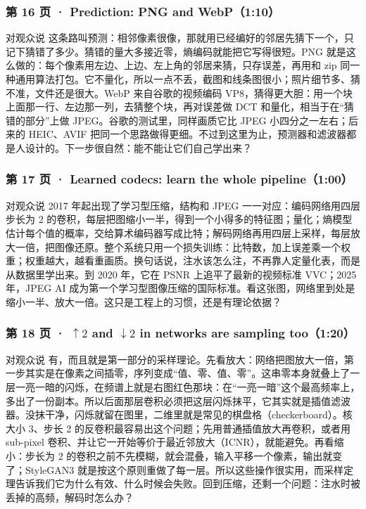\subsubsection*{第 16 页 · Prediction: PNG and WebP（1:10）}
\begin{exampleblock}{对观众说}
这条路叫预测：相邻像素很像，那就用已经编好的邻居先猜下一个，只记下猜错了多少。猜错的量大多接近零，熵编码就能把它写得很短。PNG 就是这么做的：每个像素用左边、上边、左上角的邻居来猜，只存误差，再用和 zip 同一种通用算法打包。它不量化，所以一点不丢，截图和线条图很小；照片细节多、猜不准，文件还是很大。WebP 来自谷歌的视频编码 VP8，猜得更大胆：用一个块上面那一行、左边那一列，去猜整个块，再对误差做 DCT 和量化，相当于在“猜错的部分”上做 JPEG。谷歌的测试里，同样画质它比 JPEG 小四分之一左右；后来的 HEIC、AVIF 把同一个思路做得更细。不过到这里为止，预测器和滤波器都是人设计的。下一步很自然：能不能让它们自己学出来？
\end{exampleblock}

\subsubsection*{第 17 页 · Learned codecs: learn the whole pipeline（1:00）}
\begin{exampleblock}{对观众说}
2017 年起出现了学习型压缩，结构和 JPEG 一一对应：编码网络用四层步长为 2 的卷积，每层把图缩小一半，得到一个小得多的特征图；量化；熵模型估计每个值的概率，交给算术编码器写成比特；解码网络再用四层上采样，每层放大一倍，把图像还原。整个系统只用一个损失训练：比特数，加上误差乘一个权重；权重越大，越看重画质。换句话说，注水该怎么注，不再靠人定量化表，而是从数据里学出来。到 2020 年，它在 PSNR 上追平了最新的视频标准 VVC；2025 年，JPEG AI 成为第一个学习型图像压缩的国际标准。看这张图，网络里到处是缩小一半、放大一倍。这只是工程上的习惯，还是有理论依据？
\end{exampleblock}

\subsubsection*{第 18 页 · $\uparrow2$ and $\downarrow2$ in networks are sampling too（1:20）}
\begin{exampleblock}{对观众说}
有，而且就是第一部分的采样理论。先看放大：网络把图放大一倍，第一步其实是在像素之间插零，序列变成“值、零、值、零”。这串零本身就叠上了一层一亮一暗的闪烁，在频谱上就是右图红色那块：在“一亮一暗”这个最高频率上，多出了一份副本。所以后面那层卷积必须把这层闪烁抹平，它其实就是插值滤波器。没抹干净，闪烁就留在图里，二维里就是常见的棋盘格（checkerboard）。核大小 3、步长 2 的反卷积最容易出这个问题；先用普通插值放大再卷积，或者用 sub-pixel 卷积、并让它一开始等价于最近邻放大（ICNR），就能避免。再看缩小：步长为 2 的卷积之前不先模糊，就会混叠，输入平移一个像素，输出就变了；StyleGAN3 就是按这个原则重做了每一层。所以这些操作很实用，而采样定理告诉我们它为什么有效、什么时候会失败。回到压缩，还剩一个问题：注水时被丢掉的高频，解码时怎么办？
\end{exampleblock}

